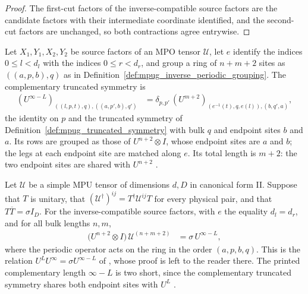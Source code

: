 \begin{proof}\leanok
    The first-cut factors of the inverse-compatible source factors are the
    candidate factors with their intermediate coordinate identified, and the
    second-cut factors are unchanged, so both contractions agree entrywise.
\end{proof}

\begin{definition}
    \label{def:mpug_complementary_truncated_symmetry}
    \leanok
    Let $X_1,Y_1,X_2,Y_2$ be source factors of an MPO tensor $\mathcal U$,
    let $e$ identify the indices $0\leq l<d_l$ with the indices
    $0\leq r<d_r$, and group a ring of $n+m+2$ sites as $((a,p,b),q)$ as in
    Definition~\ref{def:mpug_inverse_periodic_grouping}. The complementary
    truncated symmetry is
    \begin{align}
        (U^{\infty-L})_{((l,p,t),q),((a,p',b),q')}
         & =\delta_{p,p'}\,
        (U^{m+2})_{(e^{-1}(t),q,e(l)),(b,q',a)},
    \end{align}
    the identity on $p$ and the truncated symmetry of
    Definition~\ref{def:mpug_truncated_symmetry} with bulk $q$ and endpoint
    sites $b$ and $a$. Its rows are grouped as those of $U^{n+2}\otimes I$,
    whose endpoint sites are $a$ and $b$; the legs at each endpoint site are
    matched along $e$. Its total length is $m+2$: the two endpoint sites are
    shared with $U^{n+2}$
    \cite{gap:fbc25_complementary_truncation_shared_endpoints}.
\end{definition}

\begin{lemma}
    \label{thm:mpug_inverse_complementary_truncation}
    \leanok
    Let $\mathcal U$ be a simple MPU tensor of dimensions $d,D$ in canonical
    form II. Suppose that $T$ is unitary, that
    $(\mathcal U^\dagger)^{ij}=T^\dagger\mathcal U^{ij}T$ for every physical
    pair, and that $T\overline T=\sigma I_D$. For the inverse-compatible
    source factors, with $e$ the equality $d_l=d_r$, and for all bulk lengths
    $n,m$,
    \begin{align}
        \bigl(U^{n+2}\otimes I\bigr)\,\mathcal U^{(n+m+2)}
         & =\sigma\,U^{\infty-L},
    \end{align}
    where the periodic operator acts on the ring in the order $(a,p,b,q)$.
    This is the relation $U^LU^\infty=\sigma U^{\infty-L}$ of
    \cite[lines~5344--5348]{FrancoRubio2025MPUGauging}, whose proof is left
    to the reader there. The printed complementary length $\infty-L$ is two
    short, since the complementary truncated symmetry shares both endpoint
    sites with $U^L$
    \cite{gap:fbc25_complementary_truncation_shared_endpoints}.
\end{lemma}

